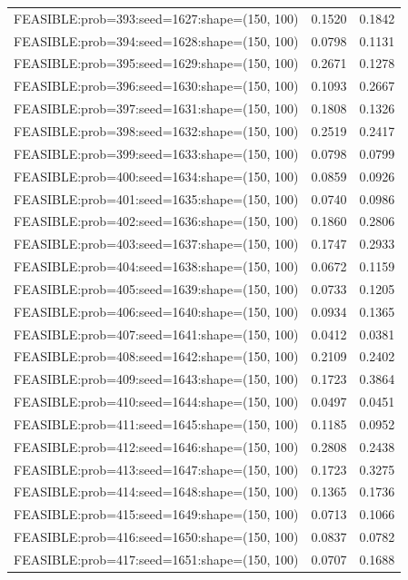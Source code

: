 \begin{longtable}{lcc}
FEASIBLE:prob=393:seed=1627:shape=(150, 100) &   0.1520 & 0.1842 \\
FEASIBLE:prob=394:seed=1628:shape=(150, 100) &   0.0798 & 0.1131 \\
FEASIBLE:prob=395:seed=1629:shape=(150, 100) &   0.2671 & 0.1278 \\
FEASIBLE:prob=396:seed=1630:shape=(150, 100) &   0.1093 & 0.2667 \\
FEASIBLE:prob=397:seed=1631:shape=(150, 100) &   0.1808 & 0.1326 \\
FEASIBLE:prob=398:seed=1632:shape=(150, 100) &   0.2519 & 0.2417 \\
FEASIBLE:prob=399:seed=1633:shape=(150, 100) &   0.0798 & 0.0799 \\
FEASIBLE:prob=400:seed=1634:shape=(150, 100) &   0.0859 & 0.0926 \\
FEASIBLE:prob=401:seed=1635:shape=(150, 100) &   0.0740 & 0.0986 \\
FEASIBLE:prob=402:seed=1636:shape=(150, 100) &   0.1860 & 0.2806 \\
FEASIBLE:prob=403:seed=1637:shape=(150, 100) &   0.1747 & 0.2933 \\
FEASIBLE:prob=404:seed=1638:shape=(150, 100) &   0.0672 & 0.1159 \\
FEASIBLE:prob=405:seed=1639:shape=(150, 100) &   0.0733 & 0.1205 \\
FEASIBLE:prob=406:seed=1640:shape=(150, 100) &   0.0934 & 0.1365 \\
FEASIBLE:prob=407:seed=1641:shape=(150, 100) &   0.0412 & 0.0381 \\
FEASIBLE:prob=408:seed=1642:shape=(150, 100) &   0.2109 & 0.2402 \\
FEASIBLE:prob=409:seed=1643:shape=(150, 100) &   0.1723 & 0.3864 \\
FEASIBLE:prob=410:seed=1644:shape=(150, 100) &   0.0497 & 0.0451 \\
FEASIBLE:prob=411:seed=1645:shape=(150, 100) &   0.1185 & 0.0952 \\
FEASIBLE:prob=412:seed=1646:shape=(150, 100) &   0.2808 & 0.2438 \\
FEASIBLE:prob=413:seed=1647:shape=(150, 100) &   0.1723 & 0.3275 \\
FEASIBLE:prob=414:seed=1648:shape=(150, 100) &   0.1365 & 0.1736 \\
FEASIBLE:prob=415:seed=1649:shape=(150, 100) &   0.0713 & 0.1066 \\
FEASIBLE:prob=416:seed=1650:shape=(150, 100) &   0.0837 & 0.0782 \\
FEASIBLE:prob=417:seed=1651:shape=(150, 100) &   0.0707 & 0.1688 \\

\end{longtable}

